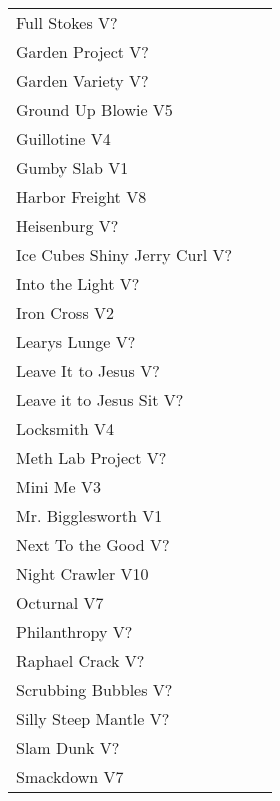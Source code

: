 \begin{center}
\begin{supertabular}{llr}
Full Stokes V?&& \pageref{rt:Full Stokes} \\
Garden Project V?&& \pageref{rt:Garden Project} \\
Garden Variety V?&& \pageref{rt:Garden Variety} \\
Ground Up Blowie V5&   & \pageref{rt:Ground Up Blowie} \\
Guillotine V4&   & \pageref{rt:Guillotine} \\
Gumby Slab V1&    & \pageref{rt:Gumby Slab} \\
Harbor Freight V8&& \pageref{vr:Harbor Freight} \\
Heisenburg V?&& \pageref{rt:Heisenburg} \\
Ice Cubes Shiny Jerry Curl V?&& \pageref{rt:Ice Cubes Shiny Jerry Curl} \\
Into the Light V?&& \pageref{rt:Into the Light} \\
Iron Cross V2& & \pageref{vr:Iron Cross} \\
Learys Lunge V?&& \pageref{rt:Learys Lunge} \\
Leave It to Jesus V?&& \pageref{rt:Leave It to Jesus} \\
Leave it to Jesus Sit V?&& \pageref{vr:Leave it to Jesus Sit} \\
Locksmith V4&     & \pageref{rt:Locksmith} \\
Meth Lab Project V?&& \pageref{rt:Meth Lab Project} \\
Mini Me V3&& \pageref{rt:Mini Me} \\
Mr. Bigglesworth V1& & \pageref{vr:Mr. Bigglesworth} \\
Next To the Good V?&& \pageref{rt:Next To the Good} \\
Night Crawler V10&& \pageref{rt:Night Crawler} \\
Octurnal V7&     & \pageref{rt:Octurnal} \\
Philanthropy V?&& \pageref{rt:Philanthropy} \\
Raphael Crack V?&& \pageref{rt:Raphael Crack} \\
Scrubbing Bubbles V?&& \pageref{rt:Scrubbing Bubbles} \\
Silly Steep Mantle V?&& \pageref{rt:Silly Steep Mantle} \\
Slam Dunk V?&& \pageref{rt:Slam Dunk} \\
Smackdown V7&    & \pageref{rt:Smackdown} \\

\end{supertabular}
\end{center}
